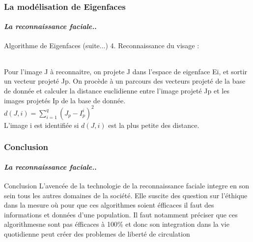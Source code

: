 \documentclass{beamer}
\begin{document}
	\begin{frame}
		\frametitle{La modélisation de Eigenfaces}
		\framesubtitle{\textit{La reconnaissance faciale.}.}
		\begin{block}{Algorithme de Eigenfaces (suite...)}
4. Reconnaissance du visage :\\\
\par Pour l’image J à reconnaitre, on projete J dans l’espace de eigenface Ei, et sortir un vecteur projeté Jp.
On procède à un parcours des vecteurs projeté de la base de donnée et calculer la distance euclidienne entre l’image projeté Jp et les images projetés Ip de la base de donnée. \\
$d(J,i) = \sum_{i=1}^{q} (J_{p}-I_{p}^{i})^{2}$\\
L’image i est identifiée si $d(J,i)$ est la plus petite des distance.

		\end{block}
	\end{frame}
	\begin{frame}
		\frametitle{Conclusion}
		\framesubtitle{\textit{La reconnaissance faciale.}.}
		\begin{block}{Conclusion}
L’avencée de la technologie de la reconnaissance faciale integre en son sein tous les autres domaines de la société. Elle suscite des question sur l’éthique dans la mesure où pour que ces algorithmes soient éfficaces il faut des informations et données d’une population. Il faut notamment préciser que ces algorithmesne sont pas éfficaces à 100\% et donc son integration dans la vie quotidienne peut créer des problemes de liberté de circulation
		\end{block}
	\end{frame}
	
\end{document}
